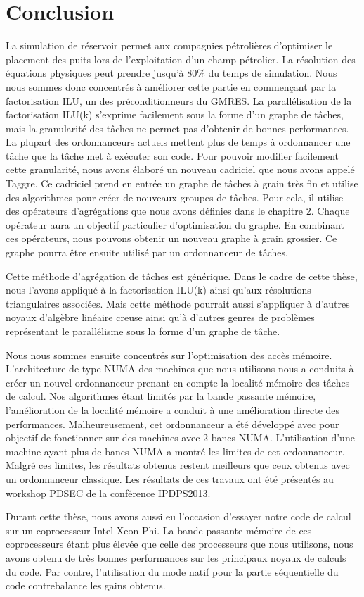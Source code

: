 \section{Conclusion}
La simulation de réservoir permet aux compagnies pétrolières d'optimiser le placement des puits lors de l'exploitation d'un champ pétrolier.
%
La résolution des équations physiques peut prendre jusqu'à 80\% du temps de simulation.
%
Nous nous sommes donc concentrés à améliorer cette partie en commençant par la factorisation ILU, un des préconditionneurs du GMRES.
%
La parallélisation de la factorisation ILU(k) s'exprime facilement sous la forme d'un graphe de tâches, mais la granularité des tâches ne permet pas d'obtenir de bonnes performances.
%
La plupart des ordonnanceurs actuels mettent plus de temps à ordonnancer une tâche que la tâche met à exécuter son code.
%
Pour pouvoir modifier facilement cette granularité, nous avons élaboré un nouveau cadriciel que nous avons appelé Taggre.
%
Ce cadriciel prend en entrée un graphe de tâches à grain très fin et utilise des algorithmes pour créer de nouveaux groupes de tâches.
%
Pour cela, il utilise des opérateurs d'agrégations que nous avons définies dans le chapitre 2.
%
Chaque opérateur aura un objectif particulier d'optimisation du graphe.
%
En combinant ces opérateurs, nous pouvons obtenir un nouveau graphe à grain grossier.
%
Ce graphe pourra être ensuite utilisé par un ordonnanceur de tâches.

Cette méthode d'agrégation de tâches est générique.
%
Dans le cadre de cette thèse, nous l'avons appliqué à la factorisation ILU(k) ainsi qu'aux résolutions triangulaires associées.
%
Mais cette méthode pourrait aussi s'appliquer à d'autres noyaux d'algèbre linéaire creuse ainsi qu'à d'autres genres de problèmes représentant le parallélisme sous la forme d'un graphe de tâche.

Nous nous sommes ensuite concentrés sur l'optimisation des accès mémoire.
%
L'architecture de type NUMA des machines que nous utilisons nous a conduits à créer un nouvel ordonnanceur prenant en compte la localité mémoire des tâches de calcul.
%
Nos algorithmes étant limités par la bande passante mémoire, l'amélioration de la localité mémoire a conduit à une amélioration directe des performances.
%
Malheureusement, cet ordonnanceur a été développé avec pour objectif de fonctionner sur des machines avec 2 bancs NUMA.
%
L'utilisation d'une machine ayant plus de bancs NUMA a montré les limites de cet ordonnanceur.
%
Malgré ces limites, les résultats obtenus restent meilleurs que ceux obtenus avec un ordonnanceur classique.
%
Les résultats de ces travaux ont été présentés au workshop PDSEC de la conférence IPDPS2013.

Durant cette thèse, nous avons aussi eu l'occasion d'essayer notre code de calcul sur un coprocesseur Intel Xeon Phi.
%
La bande passante mémoire de ces coprocesseurs étant plus élevée que celle des processeurs que nous utilisons, nous avons obtenu de très bonnes performances sur les principaux noyaux de calculs du code.
%
Par contre, l'utilisation du mode natif pour la partie séquentielle du code contrebalance les gains obtenus.
